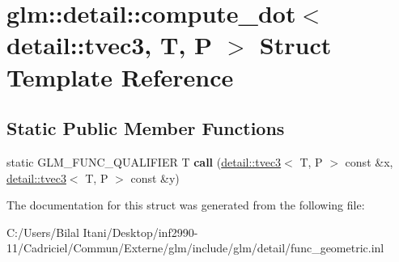 \hypertarget{structglm_1_1detail_1_1compute__dot_3_01detail_1_1tvec3_00_01_t_00_01_p_01_4}{}\section{glm\+:\+:detail\+:\+:compute\+\_\+dot$<$ detail\+:\+:tvec3, T, P $>$ Struct Template Reference}
\label{structglm_1_1detail_1_1compute__dot_3_01detail_1_1tvec3_00_01_t_00_01_p_01_4}
\subsection*{Static Public Member Functions}
\begin{DoxyCompactItemize}
\item 
static G\+L\+M\+\_\+\+F\+U\+N\+C\+\_\+\+Q\+U\+A\+L\+I\+F\+I\+ER T {\bfseries call} (\hyperlink{structglm_1_1detail_1_1tvec3}{detail\+::tvec3}$<$ T, P $>$ const \&x, \hyperlink{structglm_1_1detail_1_1tvec3}{detail\+::tvec3}$<$ T, P $>$ const \&y)\hypertarget{structglm_1_1detail_1_1compute__dot_3_01detail_1_1tvec3_00_01_t_00_01_p_01_4_a2320996e972e6955b19c23ab96c77626}{}\label{structglm_1_1detail_1_1compute__dot_3_01detail_1_1tvec3_00_01_t_00_01_p_01_4_a2320996e972e6955b19c23ab96c77626}

\end{DoxyCompactItemize}


The documentation for this struct was generated from the following file\+:\begin{DoxyCompactItemize}
\item 
C\+:/\+Users/\+Bilal Itani/\+Desktop/inf2990-\/11/\+Cadriciel/\+Commun/\+Externe/glm/include/glm/detail/func\+\_\+geometric.\+inl\end{DoxyCompactItemize}
